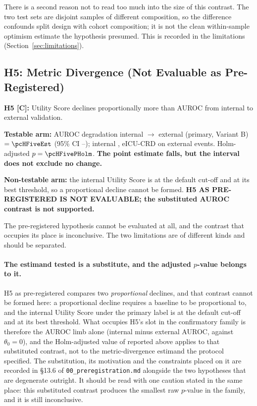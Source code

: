 There is a second reason not to read too much into the size of this contrast.
The two test sets are disjoint samples of different composition, so the
difference confounds split design with cohort composition; it is not the clean
within-sample optimism estimate the hypothesis presumed. This is recorded in
the limitations (Section~\ref{sec:limitations}).

\subsection{H5: Metric Divergence (Not Evaluable as Pre-Registered)}
\label{sec:h5}

\begin{mdframed}[backgroundcolor=ATUOrange!20, linecolor=ATUOrange]
    \textbf{H5 [C]:} Utility Score declines proportionally more than AUROC from
    internal to external validation.

    \textbf{Testable arm:} AUROC degradation internal $\to$ external (primary,
    Variant B) $= \pcHFiveEst$ (95\% CI \pcHFiveCiLo--\pcHFiveCiHi); internal
    \pcAurocPrimaryB, eICU-CRD \pcExtAurocPrimaryB{} on \pcExtNEventsB{}
    external events. Holm-adjusted $p = \pcHFivePHolm$.
    \textbf{The point estimate falls, but the interval does not exclude no
    change.}

    \textbf{Non-testable arm:} the internal Utility Score is
    \pcUtilityPrimaryB{} at the default cut-off and \pcUtilityMaxPrimaryB{} at
    its best threshold, so a proportional decline cannot be formed.
    \textbf{H5 AS PRE-REGISTERED IS NOT EVALUABLE; the substituted AUROC
    contrast is not supported.}
\end{mdframed}

The pre-registered hypothesis cannot be evaluated at all, and the contrast that
occupies its place is inconclusive. The two limitations are of different kinds
and should be separated.

\paragraph{The estimand tested is a substitute, and the adjusted $p$-value
belongs to it.} H5 as pre-registered compares two \emph{proportional} declines,
and that contrast cannot be formed here: a proportional decline requires a
baseline to be proportional to, and the internal Utility Score under the primary
label is \pcUtilityPrimaryB{} at the default cut-off and \pcUtilityMaxPrimaryB{}
at its best threshold. What occupies H5's slot in the confirmatory family is
therefore the AUROC limb alone (internal minus external AUROC, against
$\theta_0 = 0$), and the Holm-adjusted value of \pcHFivePHolm{} reported above
applies to that substituted contrast, not to the metric-divergence estimand the
protocol specified. The substitution, its motivation and the constraints placed
on it are recorded in \S13.6 of \texttt{00\_preregistration.md} alongside the
two hypotheses that are degenerate outright. It should be read with one caution
stated in the same place: this substituted contrast produces the smallest raw
$p$-value in the family, and it is still inconclusive.

